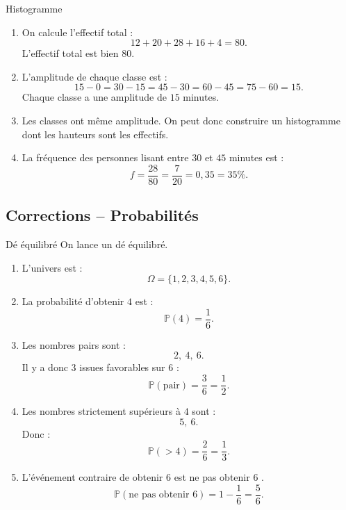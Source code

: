 \documentclass[11pt,a4paper]{article}
\newcommand{\Prob}{\mathbb{P}}
\begin{document}
\begin{correctionbox}{Histogramme}
\begin{enumerate}
    \item On calcule l'effectif total :
    \[
    12+20+28+16+4=80.
    \]
    L'effectif total est bien $80$.
    
    \item L'amplitude de chaque classe est :
    \[
    15-0=30-15=45-30=60-45=75-60=15.
    \]
    Chaque classe a une amplitude de $15$ minutes.
    
    \item Les classes ont même amplitude. On peut donc construire un histogramme dont les hauteurs sont les effectifs.
    
    \item La fréquence des personnes lisant entre $30$ et $45$ minutes est :
    \[
    f=\frac{28}{80}=\frac{7}{20}=0{,}35=35\%.
    \]
\end{enumerate}
\end{correctionbox}

\subsection{Corrections -- Probabilités}

\begin{correctionbox}{Dé équilibré}
On lance un dé équilibré.

\begin{enumerate}
    \item L'univers est :
    \[
    \Omega=\{1,2,3,4,5,6\}.
    \]
    
    \item La probabilité d'obtenir $4$ est :
    \[
    \Prob(4)=\frac{1}{6}.
    \]
    
    \item Les nombres pairs sont :
    \[
    2,\ 4,\ 6.
    \]
    Il y a donc $3$ issues favorables sur $6$ :
    \[
    \Prob(\text{pair})=\frac{3}{6}=\frac{1}{2}.
    \]
    
    \item Les nombres strictement supérieurs à $4$ sont :
    \[
    5,\ 6.
    \]
    Donc :
    \[
    \Prob(>4)=\frac{2}{6}=\frac{1}{3}.
    \]
    
    \item L'événement contraire de \og obtenir $6$ \fg{} est \og ne pas obtenir $6$ \fg.
    \[
    \Prob(\text{ne pas obtenir }6)=1-\frac{1}{6}=\frac{5}{6}.
    \]
\end{enumerate}
\end{correctionbox}
\end{document}
